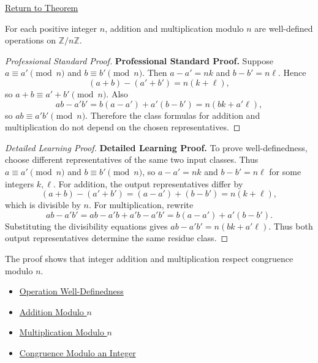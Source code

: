 \newpage
{}
\label{prf:modular-operations-well-defined}

\begin{remark*}[Return]
\hyperref[thm:modular-operations-well-defined]{Return to Theorem}
\end{remark*}

\begin{theorem*}
For each positive integer \(n\), addition and multiplication modulo \(n\) are
well-defined operations on \(\mathbb{Z}/n\mathbb{Z}\).
\end{theorem*}

\begin{proof}[Professional Standard Proof]
\LRAProofBodyStart
\textbf{Professional Standard Proof.}
Suppose \(a\equiv a'\pmod n\) and \(b\equiv b'\pmod n\). Then
\(a-a'=nk\) and \(b-b'=n\ell\). Hence
\[
(a+b)-(a'+b')=n(k+\ell),
\]
so \(a+b\equiv a'+b'\pmod n\). Also
\[
ab-a'b'=b(a-a')+a'(b-b')=n(bk+a'\ell),
\]
so \(ab\equiv a'b'\pmod n\). Therefore the class formulas for addition and
multiplication do not depend on the chosen representatives.
\end{proof}

\begin{proof}[Detailed Learning Proof]
\LRAProofBodyStart
\textbf{Detailed Learning Proof.}
To prove well-definedness, choose different representatives of the same two
input classes. Thus \(a\equiv a'\pmod n\) and \(b\equiv b'\pmod n\), so
\(a-a'=nk\) and \(b-b'=n\ell\) for some integers \(k,\ell\). For addition,
the output representatives differ by
\[
(a+b)-(a'+b')=(a-a')+(b-b')=n(k+\ell),
\]
which is divisible by \(n\). For multiplication, rewrite
\[
ab-a'b'=ab-a'b+a'b-a'b'=b(a-a')+a'(b-b').
\]
Substituting the divisibility equations gives \(ab-a'b'=n(bk+a'\ell)\).
Thus both output representatives determine the same residue class.
\end{proof}

\begin{remark*}
The proof shows that integer addition and multiplication respect congruence
modulo \(n\).
\end{remark*}

\begin{dependencies}
\begin{itemize}
  \item \hyperref[def:operation-well-definedness]{Operation Well-Definedness}
  \item \hyperref[def:addition-modulo-n]{Addition Modulo \(n\)}
  \item \hyperref[def:multiplication-modulo-n]{Multiplication Modulo \(n\)}
  \item \hyperref[def:congruence-modulo-integer]{Congruence Modulo an Integer}
\end{itemize}
\end{dependencies}

\clearpage

